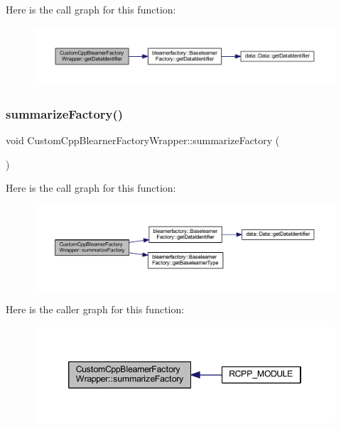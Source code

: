 Here is the call graph for this function\+:\nopagebreak
\begin{figure}[H]
\begin{center}
\leavevmode
\includegraphics[width=350pt]{class_custom_cpp_blearner_factory_wrapper_a0ec23af6dd4dc8a390465d41be516983_cgraph}
\end{center}
\end{figure}
\mbox{\label{class_custom_cpp_blearner_factory_wrapper_a434199d8e50058abcec1ba82c566ef0c}} 
\subsubsection{\texorpdfstring{summarize\+Factory()}{summarizeFactory()}}
{\footnotesize\ttfamily void Custom\+Cpp\+Blearner\+Factory\+Wrapper\+::summarize\+Factory (\begin{DoxyParamCaption}{ }\end{DoxyParamCaption})\hspace{0.3cm}{\ttfamily [inline]}}

Here is the call graph for this function\+:\nopagebreak
\begin{figure}[H]
\begin{center}
\leavevmode
\includegraphics[width=350pt]{class_custom_cpp_blearner_factory_wrapper_a434199d8e50058abcec1ba82c566ef0c_cgraph}
\end{center}
\end{figure}
Here is the caller graph for this function\+:\nopagebreak
\begin{figure}[H]
\begin{center}
\leavevmode
\includegraphics[width=346pt]{class_custom_cpp_blearner_factory_wrapper_a434199d8e50058abcec1ba82c566ef0c_icgraph}
\end{center}
\end{figure}


